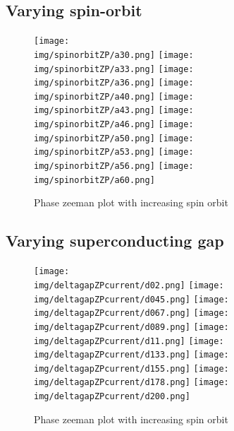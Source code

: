 \documentclass[10pt,a4paper]{article}
\newcommand{\img}{./images}
\begin{document}
	\subsection{Varying spin-orbit}
		\begin{figure}[H]
			\texttt{[image: \\img/spinorbitZP/a30.png]}
			\texttt{[image: \\img/spinorbitZP/a33.png]}
			\texttt{[image: \\img/spinorbitZP/a36.png]}
			\texttt{[image: \\img/spinorbitZP/a40.png]}
			\texttt{[image: \\img/spinorbitZP/a43.png]}
			\texttt{[image: \\img/spinorbitZP/a46.png]}
			\texttt{[image: \\img/spinorbitZP/a50.png]}
			\texttt{[image: \\img/spinorbitZP/a53.png]}
			\texttt{[image: \\img/spinorbitZP/a56.png]}
			\texttt{[image: \\img/spinorbitZP/a60.png]}
			\caption{Phase zeeman plot with increasing spin orbit}
		\end{figure}
	\subsection{Varying superconducting gap}
		\begin{figure}[H]
			\texttt{[image: \\img/deltagapZPcurrent/d02.png]}
			\texttt{[image: \\img/deltagapZPcurrent/d045.png]}
			\texttt{[image: \\img/deltagapZPcurrent/d067.png]}
			\texttt{[image: \\img/deltagapZPcurrent/d089.png]}
			\texttt{[image: \\img/deltagapZPcurrent/d11.png]}
			\texttt{[image: \\img/deltagapZPcurrent/d133.png]}
			\texttt{[image: \\img/deltagapZPcurrent/d155.png]}
			\texttt{[image: \\img/deltagapZPcurrent/d178.png]}
			\texttt{[image: \\img/deltagapZPcurrent/d200.png]}
			\caption{Phase zeeman plot with increasing spin orbit}
		\end{figure}

\clearpage
\printglossaries
\end{document}
